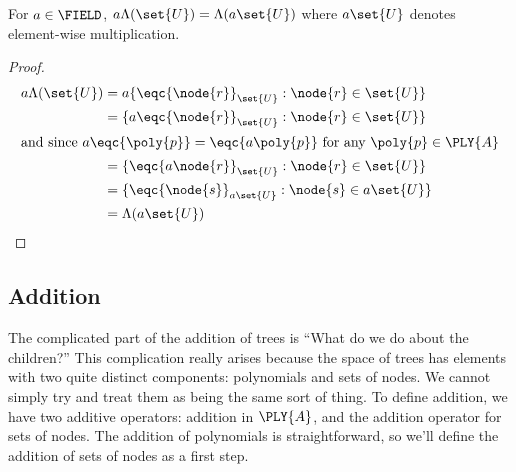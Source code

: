
\begin{proposition}\label{aLambda}
  For $a \in \FIELD$, $a \Lambda(\set{U}) = \Lambda(a\set{U})$ where $a\set{U}$ denotes element-wise
  multiplication.
  \begin{proof}
    \begin{align}
      a\Lambda(\set{U}) &= a \{\eqc{\node{r}}_{\set{U}}: \node{r}\in\set{U}\}\notag\\ 
      &= \{a\eqc{\node{r}}_{\set{U}}: \node{r}\in\set{U}\}\notag\\
      \intertext{and since  $a\eqc{\poly{p}} = \eqc{a\poly{p}}$ for
        any $\poly{p}\in\PLY{A}$}
      &= \{\eqc{a\node{r}}_{\set{U}}: \node{r}\in\set{U}\}\notag\\
      &= \{\eqc{\node{s}}_{a\set{U}}: \node{s}\in a \set{U}\}\notag\\
      &= \Lambda(a\set{U})
    \end{align}
  \end{proof}
\end{proposition}

\subsection{Addition}
The complicated part of the addition of trees is ``What do we do about
the children?'' This complication really arises because the space of
trees has elements with two quite distinct components: polynomials and
sets of nodes. We cannot simply try and treat them as being the same
sort of thing. To define addition, we have two additive operators:
addition in $\PLY{A}$, and the addition operator for sets of nodes.
The addition of polynomials is straightforward, so we'll define the
addition of sets of nodes as a first step.

